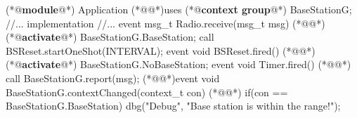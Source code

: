 \begin{Sbox}
\begin{minipage}{\columnwidth}
\begin{csource}
(*@\textbf{module}@*) Application {
  (*@@*)uses (*@\textbf{context group}@*) BaseStationG;
  //...
}implementation {
  //...
   event msg_t Radio.receive(msg_t msg) {
  (*@@*) (*@\textbf{activate}@*) BaseStationG.BaseStation;
    call BSReset.startOneShot(INTERVAL);}
   event void BSReset.fired() {
  (*@@*) (*@\textbf{activate}@*) BaseStationG.NoBaseStation;}
   event void Timer.fired() {
  (*@@*) call BaseStationG.report(msg);}
  (*@@*)event void BaseStationG.contextChanged(context_t con) {
  (*@@*) if(con == BaseStationG.BaseStation)
      dbg("Debug", "Base station is within the range!");}}
\end{csource}
\end{minipage}
\end{Sbox}